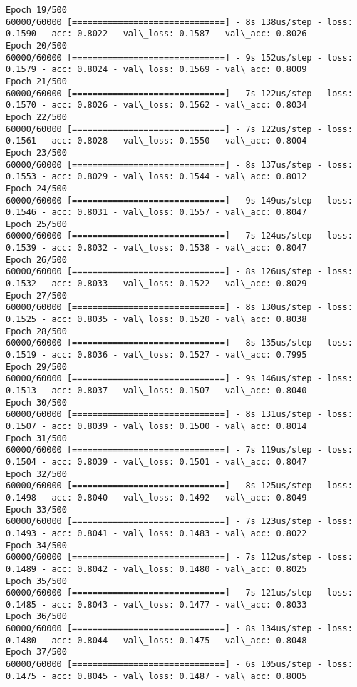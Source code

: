 \documentclass[11pt]{article}
\begin{document}
\begin{Verbatim}[commandchars=\\\{\}]
Epoch 19/500
60000/60000 [==============================] - 8s 138us/step - loss: 0.1590 - acc: 0.8022 - val\_loss: 0.1587 - val\_acc: 0.8026
Epoch 20/500
60000/60000 [==============================] - 9s 152us/step - loss: 0.1579 - acc: 0.8024 - val\_loss: 0.1569 - val\_acc: 0.8009
Epoch 21/500
60000/60000 [==============================] - 7s 122us/step - loss: 0.1570 - acc: 0.8026 - val\_loss: 0.1562 - val\_acc: 0.8034
Epoch 22/500
60000/60000 [==============================] - 7s 122us/step - loss: 0.1561 - acc: 0.8028 - val\_loss: 0.1550 - val\_acc: 0.8004
Epoch 23/500
60000/60000 [==============================] - 8s 137us/step - loss: 0.1553 - acc: 0.8029 - val\_loss: 0.1544 - val\_acc: 0.8012
Epoch 24/500
60000/60000 [==============================] - 9s 149us/step - loss: 0.1546 - acc: 0.8031 - val\_loss: 0.1557 - val\_acc: 0.8047
Epoch 25/500
60000/60000 [==============================] - 7s 124us/step - loss: 0.1539 - acc: 0.8032 - val\_loss: 0.1538 - val\_acc: 0.8047
Epoch 26/500
60000/60000 [==============================] - 8s 126us/step - loss: 0.1532 - acc: 0.8033 - val\_loss: 0.1522 - val\_acc: 0.8029
Epoch 27/500
60000/60000 [==============================] - 8s 130us/step - loss: 0.1525 - acc: 0.8035 - val\_loss: 0.1520 - val\_acc: 0.8038
Epoch 28/500
60000/60000 [==============================] - 8s 135us/step - loss: 0.1519 - acc: 0.8036 - val\_loss: 0.1527 - val\_acc: 0.7995
Epoch 29/500
60000/60000 [==============================] - 9s 146us/step - loss: 0.1513 - acc: 0.8037 - val\_loss: 0.1507 - val\_acc: 0.8040
Epoch 30/500
60000/60000 [==============================] - 8s 131us/step - loss: 0.1507 - acc: 0.8039 - val\_loss: 0.1500 - val\_acc: 0.8014
Epoch 31/500
60000/60000 [==============================] - 7s 119us/step - loss: 0.1504 - acc: 0.8039 - val\_loss: 0.1501 - val\_acc: 0.8047
Epoch 32/500
60000/60000 [==============================] - 8s 125us/step - loss: 0.1498 - acc: 0.8040 - val\_loss: 0.1492 - val\_acc: 0.8049
Epoch 33/500
60000/60000 [==============================] - 7s 123us/step - loss: 0.1493 - acc: 0.8041 - val\_loss: 0.1483 - val\_acc: 0.8022
Epoch 34/500
60000/60000 [==============================] - 7s 112us/step - loss: 0.1489 - acc: 0.8042 - val\_loss: 0.1480 - val\_acc: 0.8025
Epoch 35/500
60000/60000 [==============================] - 7s 121us/step - loss: 0.1485 - acc: 0.8043 - val\_loss: 0.1477 - val\_acc: 0.8033
Epoch 36/500
60000/60000 [==============================] - 8s 134us/step - loss: 0.1480 - acc: 0.8044 - val\_loss: 0.1475 - val\_acc: 0.8048
Epoch 37/500
60000/60000 [==============================] - 6s 105us/step - loss: 0.1475 - acc: 0.8045 - val\_loss: 0.1487 - val\_acc: 0.8005

\end{Verbatim}
\end{document}
